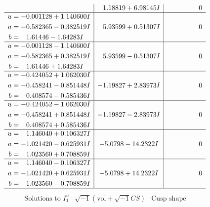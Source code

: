 \documentclass[1p]{elsarticle_modified}
\theoremstyle{definition}
\newcommand{\I}{\sqrt{-1}}
\begin{document}
$$\begin{array}{c|c|c}
 & \phantom{-}1.18819 + 6.98145 I & \phantom{-0.000000 } 0 \\ \hline\begin{aligned}
u &= -0.001128 + 1.140600 I \\
a &= -0.582365 - 0.382519 I \\
b &= \phantom{-}1.61446 - 1.64283 I\end{aligned}
 & \phantom{-}5.93599 + 0.51307 I & \phantom{-0.000000 } 0 \\ \hline\begin{aligned}
u &= -0.001128 - 1.140600 I \\
a &= -0.582365 + 0.382519 I \\
b &= \phantom{-}1.61446 + 1.64283 I\end{aligned}
 & \phantom{-}5.93599 - 0.51307 I & \phantom{-0.000000 } 0 \\ \hline\begin{aligned}
u &= -0.424052 + 1.062030 I \\
a &= -0.458241 - 0.851448 I \\
b &= \phantom{-}0.408574 - 0.585436 I\end{aligned}
 & -1.19827 + 2.83973 I & \phantom{-0.000000 } 0 \\ \hline\begin{aligned}
u &= -0.424052 - 1.062030 I \\
a &= -0.458241 + 0.851448 I \\
b &= \phantom{-}0.408574 + 0.585436 I\end{aligned}
 & -1.19827 - 2.83973 I & \phantom{-0.000000 } 0 \\ \hline\begin{aligned}
u &= \phantom{-}1.146040 + 0.106327 I \\
a &= -1.021420 - 0.625931 I \\
b &= \phantom{-}1.023560 + 0.708859 I\end{aligned}
 & -5.0798 - 14.2322 I & \phantom{-0.000000 } 0 \\ \hline\begin{aligned}
u &= \phantom{-}1.146040 - 0.106327 I \\
a &= -1.021420 + 0.625931 I \\
b &= \phantom{-}1.023560 - 0.708859 I\end{aligned}
 & -5.0798 + 14.2322 I & \phantom{-0.000000 } 0\\
 \hline 
 \end{array}$$\newpage$$\begin{array}{c|c|c}  
\text{Solutions to }I^u_{1}& \I (\text{vol} + \sqrt{-1}CS) & \text{Cusp shape}\\

\end{array}$$
\end{document}
